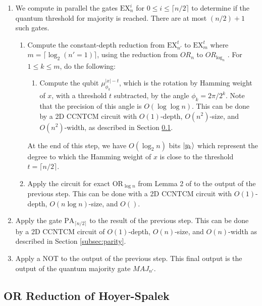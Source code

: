 \begin{enumerate}

\item
We compute in parallel the gates $\text{EX}^i_{n}$ for
$0 \le i \le \lceil n/2 \rceil$ to determine if the quantum
threshold for majority is reached. There are at most $(n/2) + 1$
such gates.

\begin{enumerate}
\item 
Compute the constant-depth reduction from $\text{EX}^t_{n'}$ to
$\text{EX}^t_{m}$ where $m = \lceil \log_2(n'=1) \rceil$, using
the reduction from $OR_n$ to $OR_{\log_n}$ \cite{Hoyer2002}.
For $1 \le k \le m$, do the following:

\begin{enumerate}
\item
Compute the qubit $\mu^{|x|-t}_{\phi_k}$, which is the rotation by Hamming 
weight of $x$, with a threshold $t$ subtracted, by the angle $\phi_k = 2\pi / 2^k$. Note that the precision
of this angle is $O(\log \log n)$. This can be done by a 2D CCNTCM circuit
with $O(1)$-depth, $O(n^2)$-size, and $O(n^2)$-width, as described in
Section \ref{subsec:or-reduce}.
\end{enumerate}

At the end of this step, we have $O(\log_2 n)$ bits $\left\vert{y_k}\right\rangle$ which 
represent the degree to which the Hamming weight of $x$ is close to the
threshold $t = \lceil n/2 \rceil$.

\item
Apply the circuit for exact $\text{OR}_{\log n}$ from Lemma 2 of
\cite{Takahashi2011} to the output of the previous step. This can
be done with a 2D CCNTCM circuit with $O(1)$-depth, $O(n \log n)$-size,
and $O()$.

\end{enumerate}

\item
Apply the gate $\text{PA}_{\lceil n/2 \rceil}$ to the result of
the previous step. This can be done by a 2D CCNTCM circuit of
$O(1)$-depth, $O(n)$-size, and $O(n)$-width as described in
Section \ref{subsec:parity}.

\item
Apply a NOT to the output of the previous step. This final
output is the output of the quantum majority gate $MAJ_{n'}$.

\end{enumerate}


\subsection{OR Reduction of Hoyer-Spalek}
\label{subsec:or-reduce}

